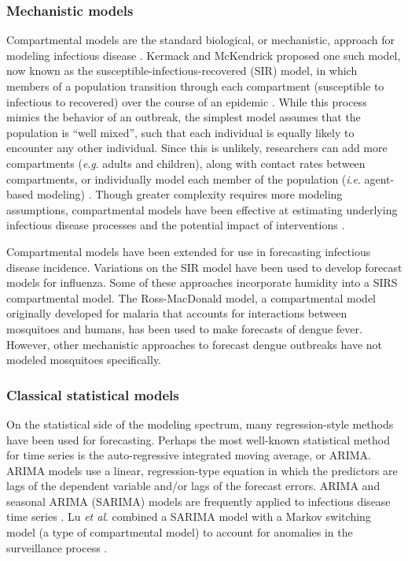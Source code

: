 \documentclass[a4paper]{article}
\newcommand{\etalspace}{\textit{et al}. }
\newcommand{\ie}{\textit{i}.\textit{e}. }
\newcommand{\eg}{\textit{e}.\textit{g}. }
\begin{document}
\subsubsection{Mechanistic models} \label{sec:mech}
Compartmental models are the standard biological, or mechanistic, approach for modeling infectious disease \cite{Keeling2007, Siettos2013, Lessler2016}.
Kermack and McKendrick proposed one such model, now known as the susceptible-infectious-recovered (SIR) model, in which members of a population transition through each compartment (susceptible to infectious to recovered) over the course of an epidemic \cite{Kermack1927}.
While this process mimics the behavior of an outbreak, the simplest model assumes that the population is ``well mixed'', such that each individual is equally likely to encounter any other individual.
Since this is unlikely, researchers can add more compartments (\eg adults and children), along with contact rates between compartments, or individually model each member of the population (\ie agent-based modeling) \cite{Eubank2004}.
Though greater complexity requires more modeling assumptions, compartmental models have been effective at estimating underlying infectious disease processes and the potential impact of interventions \cite{Lessler2016, Ferguson2006, Keeling2007, Reich2013}.

Compartmental models have been extended for use in forecasting infectious disease incidence.
Variations on the SIR model have been used to develop forecast models for influenza.\cite{Birrell2011, Nishiura2011, osthus2017forecasting}
Some of these approaches incorporate humidity into a SIRS compartmental model.\cite{Shaman2012, Shaman2013}
The Ross-MacDonald model, a compartmental model originally developed for malaria that accounts for interactions between mosquitoes and humans,\cite{Smith2012} has been used to make forecasts of  dengue fever.\cite{Dinh2016,Amaku2016,Zhu2018}
However, other mechanistic approaches to forecast dengue outbreaks have not modeled mosquitoes specifically.\cite{yamana2016superensemble}

\subsubsection{Classical statistical models}

On the statistical side of the modeling spectrum, many regression-style methods have been used for forecasting.
Perhaps the most well-known statistical method for time series is the auto-regressive integrated moving average, or ARIMA.\cite{Box1962}
ARIMA models use a linear, regression-type equation in which the predictors are lags of the dependent variable and/or lags of the forecast errors.
ARIMA and seasonal ARIMA (SARIMA) models are frequently applied to infectious disease time series \cite{Johansson2016, Siettos2013, Soyiri2013, Unkel2012, Ray2017}.
Lu \etalspace combined a SARIMA model with a Markov switching model (a type of compartmental model) to account for anomalies in the surveillance process \cite{Lu2010}.
\end{document}
